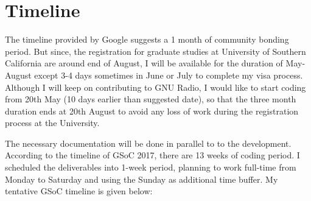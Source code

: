 \documentclass[a4paper, 11pt]{article}
\begin{document}
\section{Timeline}
The timeline provided by Google suggests a 1 month of community bonding period. But since, the registration for graduate studies at University of Southern California are around end of August, I will be available for the duration of May-August except 3-4 days sometimes in June or July to complete my visa process. Although I will keep on contributing to GNU Radio, I would like to start coding from 20th May (10 days earlier than suggested date), so that the three month duration ends at 20th August to avoid any loss of work during the registration process at the University.

The necessary documentation will be done in parallel to to the development. According to the timeline of GSoC 2017, there are 13 weeks of coding period. I scheduled the deliverables into 1-week period, planning to work full-time from Monday to Saturday and using the Sunday as additional time buffer. My tentative GSoC timeline is given below:
\end{document}
